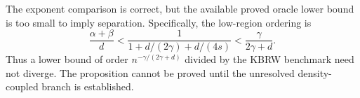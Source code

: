 The exponent comparison is correct, but the available proved oracle lower bound is too small to imply separation.  Specifically, the low-region ordering is
\[
\frac{\alpha+\beta}{d}<\frac{1}{1+d/(2\gamma)+d/(4s)}<\frac{\gamma}{2\gamma+d}.
\]
Thus a lower bound of order \(n^{-\gamma/(2\gamma+d)}\) divided by the KBRW benchmark need not diverge.  The proposition cannot be proved until the unresolved density-coupled branch is established.